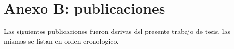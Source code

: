 \cleardoublepage{}
{}
\FormatoAnexoB

\RemoveLabelsAxUno

\AddLabelsAxDos

\let\originalstyle=\thispagestyle            %
\def\thispagestyle#1{\fancyfoot[C]{}}       %
\def\thispagestyle#1{\originalstyle{empty}} %
\def\thispagestyle#1{}                       %

\chapter*{Anexo B: publicaciones}

  \noindent Las siguientes publicaciones fueron derivas del presente trabajo de tesis, las mismas se listan en orden cronologico.

